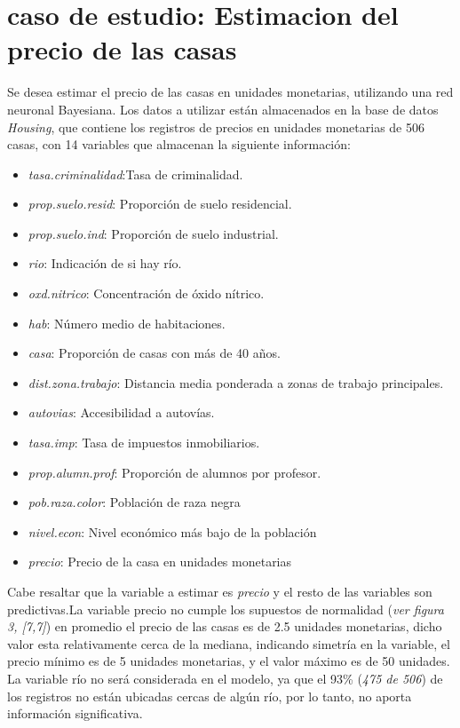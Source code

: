 \documentclass[nojss]{jss}
\begin{document}
\section{caso de estudio: Estimacion del precio de las casas}  

Se desea estimar el precio de las casas en unidades monetarias, utilizando una red neuronal Bayesiana. Los datos a utilizar están almacenados en la base de datos \textit{Housing}, que contiene los registros de precios en unidades monetarias de 506 casas, con 14 variables que almacenan la siguiente información:

\begin{itemize}
	\item \textit{tasa.criminalidad}:Tasa de criminalidad.
	\item \textit{prop.suelo.resid}: Proporción de suelo residencial.
	\item \textit{prop.suelo.ind}: Proporción de suelo industrial.	
	\item \textit{rio}: Indicación de si hay río.
	\item \textit{oxd.nitrico}: Concentración de óxido nítrico.
	\item \textit{hab}: Número medio de habitaciones.
	\item \textit{casa}: Proporción de casas con más de 40 años.
	\item \textit{dist.zona.trabajo}: Distancia media ponderada a zonas de trabajo principales.
	\item \textit{autovias}: Accesibilidad a autovías. 
	\item \textit{tasa.imp}: Tasa de impuestos inmobiliarios.
	\item \textit{prop.alumn.prof}: Proporción de alumnos por profesor.
	\item \textit{pob.raza.color}: Población de raza negra
	\item \textit{nivel.econ}: Nivel económico más bajo de la población
	\item \textit{precio}: Precio de la casa en unidades monetarias
\end{itemize}

Cabe resaltar que la variable a estimar es \textit{precio} y el resto de las variables son predictivas.La variable precio no cumple los supuestos de normalidad (\textit{ver figura 3,  [7,7]}) en promedio el precio de las casas es de 2.5 unidades monetarias, dicho valor esta relativamente cerca de la mediana, indicando simetría en la variable, el precio mínimo es de 5 unidades monetarias, y el valor máximo es de 50 unidades. La variable río no será considerada en el modelo, ya que el 93\% (\textit{475 de 506}) de los registros no están ubicadas cercas de algún río, por lo tanto, no aporta información significativa.
 
\end{document}
